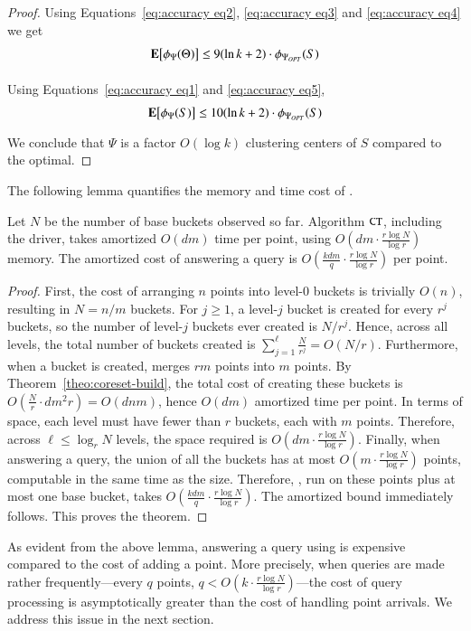 \begin{proof}
	Using Equations~\ref{eq:accuracy eq2}, \ref{eq:accuracy eq3} and \ref{eq:accuracy eq4} we get
	\begin{equation}
	\label{eq:accuracy eq5}
	\expct{\phi_{\Psi}(\Theta)} \le 9(\ln k+2)\cdot\phi_{\Psi_{OPT}}(S) 
	\end{equation}
	
	Using Equations~\ref{eq:accuracy eq1} and \ref{eq:accuracy eq5},
	\begin{equation}
	\label{eq:accuracy eq6}
	\expct{\phi_{\Psi}(S)} \le 10(\ln k+2)\cdot\phi_{\Psi_{OPT}}(S) 
	\end{equation}
	We conclude that $\Psi$ is a factor $O(\log k)$ clustering centers of $S$
	compared to the optimal.
\end{proof}



The following lemma quantifies the memory and time cost of \ct.
\begin{lemma}
\label{thm:cstree-time}
Let $N$ be the number of base buckets observed so far. 
Algorithm $\texttt{CT}$, including the driver, takes amortized $O(dm)$ time per point, 
using $O\left(dm \cdot \frac{r \log N}{\log r} \right)$ memory. 
The amortized cost of answering a query is 
$O\left( \frac{k d m}{q} \cdot \frac{r \log N}{\log r} \right)$ per point.
\end{lemma}
\begin{proof}
  First, the cost of arranging $n$ points into level-$0$ buckets is trivially
  $O(n)$, resulting in $N = n/m$ buckets.  For $j \geq 1$, a level-$j$ bucket is
  created for every $r^j$ buckets, so the number of level-$j$ buckets ever
  created is $N/r^j$.  Hence, across all levels, the total number of buckets
  created is $\sum_{j=1}^\ell \tfrac{N}{r^j} = O(N/r)$. Furthermore, when a
  bucket is created, \ct merges $rm$ points into $m$ points.  By
  Theorem~\ref{theo:coreset-build}, the total cost of creating these buckets is
  $O(\tfrac{N}r \cdot d m^2 r) = O(dnm)$, hence $O(dm)$ amortized time per
  point. 
  In terms of space, each level must have fewer than $r$ buckets, each
  with $m$ points. Therefore, across $\ell \leq \log_r N$ levels,
  the space required is $O(dm \cdot \frac{r \log N}{\log r})$.  
  Finally, when answering a query, the union of all the buckets has at most
  $O(m \cdot \frac{r \log N}{\log r})$ points, computable in the same time as
  the size.  Therefore, \kmpp, run on these points plus at most one base bucket,
  takes $O( \frac{k d m}{q} \cdot \frac{r \log N}{\log r})$.  The amortized bound immediately
  follows.  This proves the theorem.
\end{proof}


As evident from the above lemma, answering a query using \ct is expensive 
compared to the cost of adding a point.  More precisely, when queries
are made rather frequently---every $q$ points,
$q < O(k \cdot \frac{r \log N}{\log r})$---the cost of query
processing is asymptotically greater than the cost of handling point arrivals.
We address this issue in the next section.

